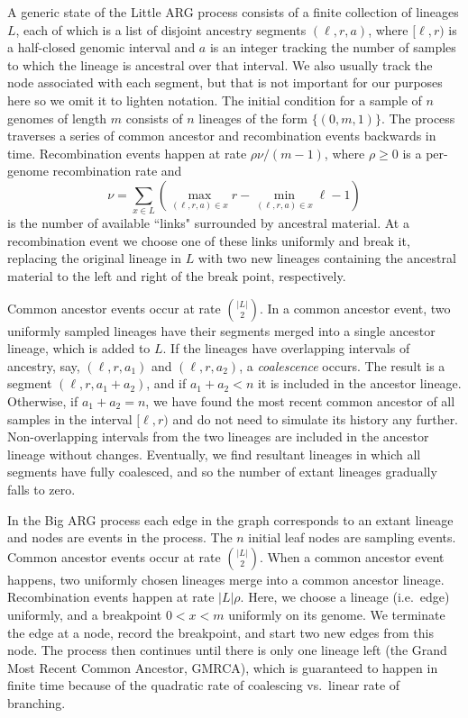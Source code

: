 \documentclass[9pt,twocolumn,twoside]{gsajnl}
\begin{document}
A generic state of the Little ARG process consists of a finite collection of lineages $L$,
each of which is a list of disjoint ancestry segments $(\ell, r, a)$, where
$[\ell, r)$ is a half-closed genomic interval and $a$ is an integer
tracking the number of samples to which the lineage is ancestral over that interval.
We also usually track the node associated with each segment, but
that is not important for our purposes here so we omit it to lighten notation.
The initial condition for a sample of $n$ genomes of length $m$ consists of $n$ lineages
of the form $\{(0, m, 1)\}$. The process traverses a series of common ancestor and
recombination events backwards in time.
Recombination events happen at rate $\rho \nu / (m - 1)$,
where $\rho \geq 0$ is a per-genome recombination rate and
 \[
 \nu = \sum_{x \in L}\left( \max_{(\ell, r, a) \in x}r
     - \min_{(\ell, r, a) \in x}\ell - 1 \right)
 \]
 is the number of available ``links" surrounded by ancestral material.
 At a recombination event we choose one of these links uniformly and break it,
 replacing the original lineage in $L$ with two new lineages containing the ancestral material
 to the left and right of the break point, respectively.

Common ancestor events occur at rate $\binom{|L|}{2}$.
In a common ancestor event, two uniformly sampled lineages have their segments
merged into a single ancestor lineage, which is added to $L$.
If the lineages have overlapping intervals of ancestry,
say, $(\ell, r, a_1)$ and $(\ell, r, a_2)$, a
\emph{coalescence} occurs. The result is a segment
$(\ell, r, a_1 + a_2)$, and if $a_1 + a_2 < n$ it is included in the
ancestor lineage. Otherwise, if $a_1 + a_2 = n$, we have found
the most recent common ancestor of all samples in the interval $[\ell, r)$
and do not need to simulate its history any further.
Non-overlapping intervals from the two lineages are included
 in the ancestor lineage without changes. Eventually,
we find resultant lineages in which all segments have fully coalesced,
and so the number of extant lineages gradually falls to zero.

In the Big ARG process each edge in the graph corresponds to an extant
lineage and nodes are events in the process. The $n$ initial leaf nodes are
sampling events. Common ancestor events occur at rate $\binom{|L|}{2}$.
When a common ancestor event happens, two uniformly chosen lineages
merge into a common ancestor lineage.
Recombination events happen at rate $|L| \rho$. Here, we choose a lineage (i.e.\ edge) uniformly,
and a breakpoint $0 < x < m$ uniformly on its genome. We terminate the edge at a
node, record the breakpoint, and start two new edges from this node. The process
then continues until there is only one lineage left (the Grand Most Recent
Common Ancestor, GMRCA), which is guaranteed to
happen in finite time because of the quadratic rate of coalescing vs.\ linear rate of branching.
\end{document}
